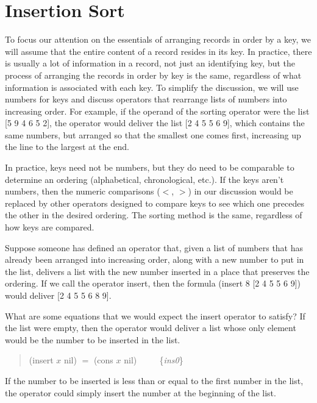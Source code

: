 \section{Insertion Sort}
\label{sec:insertion-sort}

To focus our attention on the essentials of
arranging records in order by a key, we will
assume that the entire content of a record
resides in its key.
In practice, there is usually a lot of information
in a record, not just an identifying key,
but the process of arranging the records
in order by key is the same, regardless
of what information is associated with each key.
To simplify the discussion,
we will use numbers for keys
and discuss operators that rearrange lists
of numbers into increasing order.
For example, if the operand of the sorting
operator were the list \textsf{[5 9 4 6 5 2]},
the operator would deliver the list \textsf{[2 4 5 5 6 9]},
which contains the same numbers, but arranged so
that the smallest one comes first, increasing up the
line to the largest at the end.

In practice, keys need not be numbers,
but they do need to be comparable
to determine an ordering (alphabetical, chronological, etc.).
If the keys aren't numbers,
then the numeric comparisons
($<$, $>$) in our discussion would be replaced by
other operators designed to compare
keys to see which one precedes the other
in the desired ordering.
The sorting method is the same, regardless
of how keys are compared.

Suppose someone has defined an operator that,
given a list of numbers that has
already been arranged into increasing order,
along with a new number to put in the list,
delivers a list with the new number inserted
in a place that preserves the ordering.
If we call the operator \textsf{insert}, then
the formula \textsf{(insert 8 [2 4 5 5 6 9])} would
deliver \textsf{[2 4 5 5 6 8 9]}.

What are some equations that we would expect
the insert operator to satisfy?
If the list were empty, then the operator
would deliver a list whose only element would
be the number to be inserted in the list.

\begin{quote}
\textsf{(insert $x$ nil) $=$ (cons $x$ nil)} ~~~~ \{\emph{ins0}\}
\end{quote}

If the number to be inserted is less than or equal to the
first number in the list, the operator could simply
insert the number at the beginning of the list.

